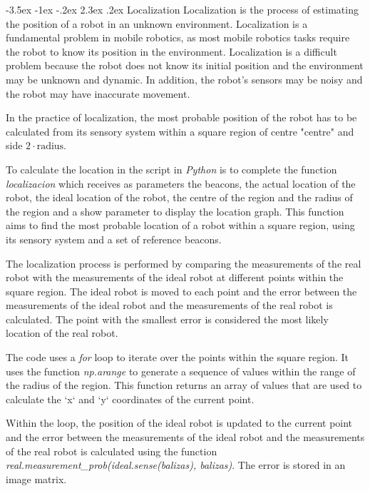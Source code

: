 \documentclass[11pt]{report}
\makeatletter
\renewcommand\chapter{\@startsection{chapter}{0}{\z@}%
    {-3.5ex \@plus -1ex \@minus -.2ex}%
    {2.3ex \@plus.2ex}%
    {\normalfont\Large\bfseries}}
\makeatother
\begin{document}
\chapter{Localization}
Localization is the process of estimating the position of a robot in an unknown environment. Localization is a fundamental problem in mobile robotics, as most mobile robotics tasks require the robot to know its position in the environment. Localization is a difficult problem because the robot does not know its initial position and the environment may be unknown and dynamic. In addition, the robot's sensors may be noisy and the robot may have inaccurate movement.

In the practice of localization, the most probable position of the robot has to be calculated from its sensory system 
within a square region of centre "centre" and side $2 \cdot \text{radius}$.

To calculate the location in the script in \emph{Python} is to complete the function \emph{localizacion} which receives as parameters the beacons, the actual location of the robot, the ideal location of the robot, the centre of the region and the radius of the region and a show parameter to display the location graph. This function aims to find the most probable location of a robot within a square region, using its sensory system and a set of reference beacons.

The localization process is performed by comparing the measurements of the real robot with the measurements of the ideal robot at different points within the square region. The ideal robot is moved to each point and the error between the measurements of the ideal robot and the measurements of the real robot is calculated. The point with the smallest error is considered the most likely location of the real robot.

The code uses a \emph{for} loop to iterate over the points within the square region. It uses the function \emph{np.arange} to generate a sequence of values within the range of the radius of the region. This function returns an array of values that are used to calculate the `x` and `y` coordinates of the current point.

Within the loop, the position of the ideal robot is updated to the current point and the error between the measurements of the ideal robot and the measurements of the real robot is calculated using the function
\emph{real.measurement\_prob(ideal.sense(balizas), balizas)}. The error is stored in an image matrix.
\end{document}
